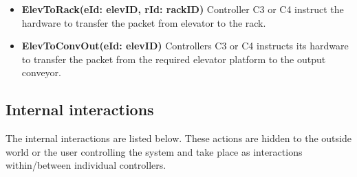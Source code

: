 \begin{itemize}
\item \textbf{ElevToRack(eId: elevID, rId: rackID)}
Controller C3 or C4 instruct the hardware to transfer the packet from elevator to the rack.

\item \textbf{ElevToConvOut(eId: elevID)}
Controllers C3 or C4 instructs its hardware to transfer the packet from the required elevator platform to the output conveyor.

\end{itemize}

\subsection*{Internal interactions}
The internal interactions are listed below. These actions are hidden to the outside world or the user controlling the system and take place as interactions within/between individual controllers.

